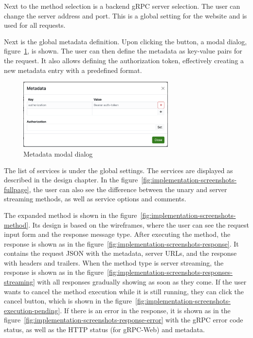 Next to the method selection is a backend gRPC server selection.
The user can change the server address and port.
This is a global setting for the website and is used for all requests.

Next is the global metadata definition.
Upon clicking the button, a modal dialog, figure~\ref{fig:implementation-screenshots-metadata-modal}, is shown.
The user can then define the metadata as key-value pairs for the request.
It also allows defining the authorization token, effectively creating a new metadata entry with a predefined format.

\begin{figure}[!htb]
    \centering
    \captionsetup{justification=centering}
    \includegraphics[width=0.7\textwidth]{images/implementation/screenshots/metadata-modal}
    \caption{Metadata modal dialog}
    \label{fig:implementation-screenshots-metadata-modal}
\end{figure}

The list of services is under the global settings.
The services are displayed as described in the design chapter.
In the figure~\ref{fig:implementation-screenshots-fullpage}, the user can also see the difference between the unary and server streaming methods, as well as service options and comments.

The expanded method is shown in the figure~\ref{fig:implementation-screenshots-method}.
Its design is based on the wireframes, where the user can see the request input form and the response message type.
After executing the method, the response is shown as in the figure~\ref{fig:implementation-screenshots-response}.
It contains the request JSON with the metadata, server URLs, and the response with headers and trailers.
When the method type is server streaming, the response is shown as in the figure~\ref{fig:implementation-screenshots-responses-streaming} with all responses gradually showing as soon as they come.
If the user wants to cancel the method execution while it is still running, they can click the cancel button, which is shown in the figure~\ref{fig:implementation-screenshots-execution-pending}.
If there is an error in the response, it is shown as in the figure~\ref{fig:implementation-screenshots-response-error} with the gRPC error code status, as well as the HTTP status (for gRPC-Web) and metadata.


